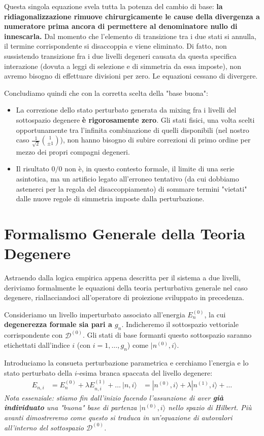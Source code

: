 Questa singola equazione svela tutta la potenza del cambio di base: \textbf{la ridiagonalizzazione rimuove chirurgicamente le cause della divergenza a numeratore prima ancora di permettere al denominatore nullo di innescarla.}
Dal momento che l'elemento di transizione tra i due stati si annulla, il termine corrispondente si disaccoppia e viene eliminato. Di fatto, non sussistendo transizione fra i due livelli degeneri causata da questa specifica interazione (dovuta a leggi di selezione e di simmetria da essa imposte), non avremo bisogno di effettuare divisioni per zero. Le equazioni cessano di divergere.

Concludiamo quindi che con la corretta scelta della "base buona":
\begin{itemize}
\item La correzione dello stato perturbato generata da mixing fra i livelli del sottospazio degenere \textbf{è rigorosamente zero}. Gli stati fisici, una volta scelti opportunamente tra l'infinita combinazione di quelli disponibili (nel nostro caso $\frac{1}{\sqrt{2}}\binom{1}{\pm 1}$), non hanno bisogno di subire correzioni di primo ordine per mezzo dei propri compagni degeneri.
\item Il risultato $0/0$ non è, in questo contesto formale, il limite di una serie asintotica, ma un artificio legato all'erroneo tentativo (da cui dobbiamo astenerci per la regola del disaccoppiamento) di sommare termini "vietati" dalle nuove regole di simmetria imposte dalla perturbazione.
\end{itemize}

\section{Formalismo Generale della Teoria Degenere}

Astraendo dalla logica empirica appena descritta per il sistema a due livelli, deriviamo formalmente le equazioni della teoria perturbativa generale nel caso degenere, riallacciandoci all'operatore di proiezione sviluppato in precedenza.

Consideriamo un livello imperturbato associato all'energia $E_n^{(0)}$, la cui \textbf{degenerezza formale sia pari a $g_n$}. Indicheremo il sottospazio vettoriale corrispondente con $\mathcal{D}^{(0)}$. Gli stati di base formanti questo sottospazio saranno etichettati dall'indice $i$ (con $i=1, \dots, g_n$) come $\vert{}n^{(0)}, i\rangle$.

Introduciamo la consueta perturbazione parametrica e cerchiamo l'energia e lo stato perturbato della $i$-esima branca spaccata del livello degenere:
\begin{align}
E_{n,i} &= E_n^{(0)} + \lambda E_{n,i}^{(1)} + \dots \
|n, i\rangle &= |n^{(0)}, i\rangle + \lambda |n^{(1)}, i\rangle + \dots
\end{align}
\textit{Nota essenziale: stiamo fin dall'inizio facendo l'assunzione di aver \textbf{già individuato} una "buona" base di partenza $\vert{}n^{(0)}, i\rangle$ nello spazio di Hilbert. Più avanti dimostreremo come questo si traduca in un'equazione di autovalori all'interno del sottospazio $\mathcal{D}^{(0)}$.}

